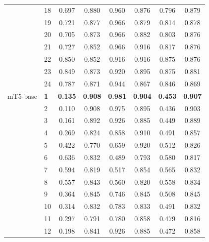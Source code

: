 \begin{longtable}{llcccccc}
 & 18 & 0.697 & 0.880 & 0.960 & 0.876 & 0.796 & 0.879 \\
 & 19 & 0.721 & 0.877 & 0.966 & 0.879 & 0.814 & 0.878 \\
 & 20 & 0.705 & 0.873 & 0.966 & 0.882 & 0.803 & 0.876 \\
 & 21 & 0.727 & 0.852 & 0.966 & 0.916 & 0.817 & 0.876 \\
 & 22 & 0.850 & 0.852 & 0.916 & 0.916 & 0.875 & 0.876 \\
 & 23 & 0.849 & 0.873 & 0.920 & 0.895 & 0.875 & 0.881 \\
 & 24 & 0.787 & 0.871 & 0.944 & 0.867 & 0.846 & 0.869 \\
\midrule
mT5-base & \textbf{1} & \textbf{0.135} & \textbf{0.908} & \textbf{0.981} & \textbf{0.904} & \textbf{0.453} & \textbf{0.907} \\
 & 2 & 0.110 & 0.908 & 0.975 & 0.895 & 0.436 & 0.903 \\
 & 3 & 0.161 & 0.892 & 0.926 & 0.885 & 0.449 & 0.889 \\
 & 4 & 0.269 & 0.824 & 0.858 & 0.910 & 0.491 & 0.857 \\
 & 5 & 0.422 & 0.770 & 0.659 & 0.920 & 0.512 & 0.826 \\
 & 6 & 0.636 & 0.832 & 0.489 & 0.793 & 0.580 & 0.817 \\
 & 7 & 0.594 & 0.819 & 0.517 & 0.854 & 0.565 & 0.832 \\
 & 8 & 0.557 & 0.843 & 0.560 & 0.820 & 0.558 & 0.834 \\
 & 9 & 0.364 & 0.845 & 0.746 & 0.845 & 0.508 & 0.845 \\
 & 10 & 0.314 & 0.832 & 0.783 & 0.833 & 0.491 & 0.832 \\
 & 11 & 0.297 & 0.791 & 0.780 & 0.858 & 0.479 & 0.816 \\
 & 12 & 0.198 & 0.841 & 0.926 & 0.885 & 0.472 & 0.858 \\
\end{longtable}
\endgroup
